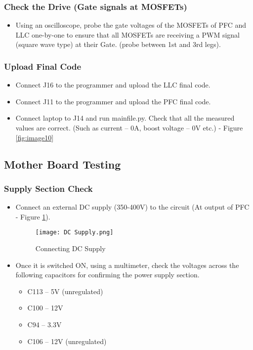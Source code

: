 \subsubsection{Check the Drive (Gate signals at MOSFETs)}
\begin{itemize}
    \item Using an oscilloscope, probe the gate voltages of the MOSFETs of PFC and LLC one-by-one to ensure that all MOSFETs are receiving a PWM signal (square wave type) at their Gate. (probe between 1st and 3rd legs).
\end{itemize}

\subsubsection{Upload Final Code}
\begin{itemize}
    \item Connect J16 to the programmer and upload the LLC final code. 
    \item Connect J11 to the programmer and upload the PFC final code.
    \item Connect laptop to J14 and run mainfile.py. Check that all the measured values are correct. (Such as current – 0A, boost voltage – 0V etc.) - Figure \ref{fig:image10}
\end{itemize}


\subsection{Mother Board Testing}

\subsubsection{Supply Section Check}
\begin{itemize}
    \item Connect an external DC supply (350-400V) to the circuit (At output of PFC - Figure \ref{fig:DC_supply}).
    \begin{figure}[H]
        \centering
        \texttt{[image: DC Supply.png]}
        \caption{Connecting DC Supply}
        \label{fig:DC_supply}
    \end{figure}
    \item Once it is switched ON, using a multimeter, check the voltages across the following capacitors for confirming the power supply section.
    \begin{itemize}
        \item C113 – 5V (unregulated)
        \item C100 – 12V
        \item C94 – 3.3V
        \item C106 – 12V (unregulated)  
    \end{itemize}
\end{itemize}

